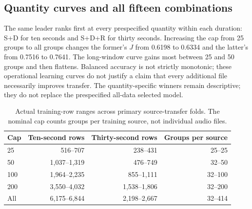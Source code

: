 \subsection{Quantity curves and all fifteen combinations}

The same leader ranks first at every prespecified quantity within each duration:
S+D for ten seconds and S+D+R for thirty seconds. Increasing the cap from 25
groups to all groups changes the former's $J$ from 0.6198 to 0.6334 and the
latter's from 0.7516 to 0.7641. The long-window curve gains most between 25 and
50 groups and then flattens. Balanced accuracy is not strictly monotonic; these
operational learning curves do not justify a claim that every additional file
necessarily improves transfer. The quantity-specific winners remain descriptive;
they do not replace the prespecified all-data selected model.

\begin{table}[htbp]
\centering\small
\caption{Actual training-row ranges across primary source-transfer folds. The
nominal cap counts groups per training source, not individual audio files.}
\begin{tabular}{lrrr}
\toprule Cap & Ten-second rows & Thirty-second rows & Groups per source \\
\midrule
25 & 516--707 & 238--431 & 25--25 \\
50 & 1,037--1,319 & 476--749 & 32--50 \\
100 & 1,964--2,235 & 855--1,111 & 32--100 \\
200 & 3,550--4,032 & 1,538--1,806 & 32--200 \\
All & 6,175--6,844 & 2,198--2,667 & 32--414 \\
\bottomrule
\end{tabular}
\end{table}

\begin{table}[p]
\centering\small
\caption{Ten-second source-transfer $J$: all fifteen combinations by five
training quantities. Combinations containing P are reported but ineligible.}

\bigskip
\caption{Thirty-second source-transfer $J$: the corresponding full grid.}

\end{table}
\begin{table}[p]
\centering\small
\caption{Ten-second mean source-transfer balanced accuracy at threshold 0.5.}

\bigskip
\caption{Thirty-second mean source-transfer balanced accuracy at threshold 0.5.}

\end{table}
\clearpage

